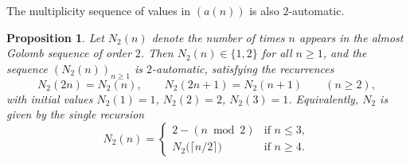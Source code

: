 \documentclass[12pt]{article}
\newtheorem{proposition}[theorem]{Proposition}
\theoremstyle{definition}
\theoremstyle{remark}
\begin{document}
The multiplicity sequence of values in $(a(n))$ is also $2$-automatic.

\begin{proposition}\label{prop:N2_multiplicity}
  Let $N_2(n)$ denote the number of times $n$ appears in the almost Golomb
  sequence of order $2$. Then $N_2(n)\in\{1,2\}$ for all $n\ge 1$, and the
  sequence $(N_2(n))_{n\ge 1}$ is $2$-automatic, satisfying the recurrences
  \begin{equation}\label{eq:N2rec}
    N_2(2n) = N_2(n),\qquad N_2(2n+1) = N_2(n+1)\qquad (n\ge 2),
  \end{equation}
  with initial values $N_2(1)=1$, $N_2(2)=2$, $N_2(3)=1$.
  Equivalently, $N_2$ is given by the single recursion
  \begin{equation}\label{eq:N2formula}
    N_2(n) = \begin{cases}
      2 - (n \bmod 2) & \text{if } n \le 3, \\
      N_2\!\bigl(\lceil n/2 \rceil\bigr) & \text{if } n \ge 4.
    \end{cases}
  \end{equation}
\end{proposition}
\end{document}
